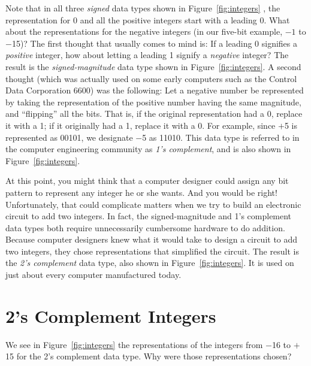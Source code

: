 \documentclass{patt}
\begin{document}
Note that in all three {\em signed} data types shown in 
Figure~\ref{fig:integers} , the representation for 0 and all the positive 
integers start with a
leading 0. What about the representations for the negative integers (in
our five-bit example, ${-}1$ to $-$15)?  The first thought that
usually comes to mind is: If a leading 0 signifies a {\em positive}\enlargethispage{-2\baselineskip}
integer, how about letting a leading 1 signify a {\em negative}
integer?  The result is the {\em signed-magnitude} data type shown in
Figure~\ref{fig:integers}.  A second thought (which was actually used on some early computers such as the
Control Data Corporation 6600) was the following: Let a negative
number be represented by taking the representation of the positive
number having the same magnitude, and ``flipping'' all the bits.  That is, if
the original representation had a 0, replace it with a 1; if it originally
had a 1, replace it with a 0.  For example, since $+$5 is represented as 00101,
we designate $-$5 as 11010.  This data type is referred to in the computer 
engineering community as {\em 1's complement}, 
and is also shown in Figure~\ref{fig:integers}.

At this point, you might think that a computer designer could assign
any bit pattern to represent any integer he or she wants.  And you
would be right!  Unfortunately, that could complicate matters when we
try to build an electronic circuit to add two integers.  In fact, the
signed-magnitude and 1's complement data types both require
unnecessarily cumbersome hardware to do addition.  Because computer
designers knew what it would take to design a circuit to add two
integers, they chose representations that simplified the 
circuit.  The result is the {\em 2's complement} data type, also shown
in Figure~\ref{fig:integers}.   It is used 
on just about every computer manufactured today.

\enlargethispage{-2\baselineskip}
\vspace{-6pt}

\section{2's Complement Integers}

We see in Figure~\ref{fig:integers} the representations of the integers 
from $-$16 to $+$15 for the 2's complement data type.  Why were those 
representations chosen?
\end{document}
